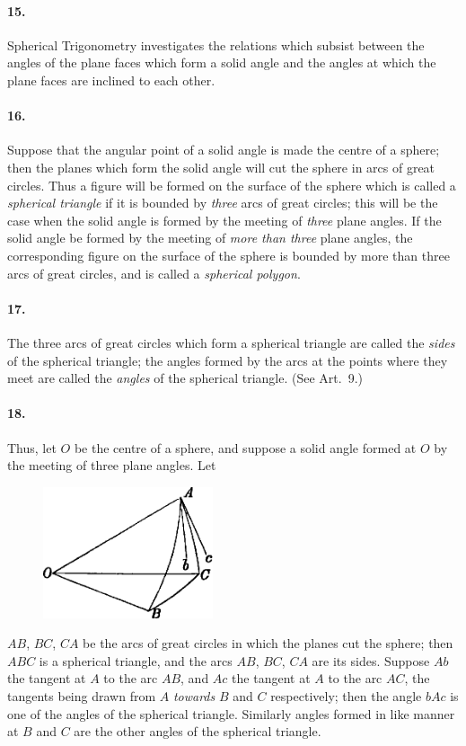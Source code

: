 \documentclass{book}[2004/02/16]
\begin{document}
\begin{mainmatter}
\begin{spacing}{1.3}
\paragraph{15.} Spherical Trigonometry investigates the relations which
subsist between the angles of the plane faces which form a solid
angle and the angles at which the plane faces are inclined to each
other.

\paragraph{16.} Suppose that the angular point of a solid angle is made
the centre of a sphere; then the planes which form the solid angle
will cut the sphere in arcs of great circles. Thus a figure will be
formed on the surface of the sphere which is called a \textit{spherical
triangle} if it is bounded by \textit{three} arcs of great circles; this will be
the case when the solid angle is formed by the meeting of \textit{three}
plane angles. If the solid angle be formed by the meeting of
\textit{more than three} plane angles, the corresponding figure on the
surface of the sphere is bounded by more than three arcs of great
circles, and is called a \textit{spherical polygon}.

\paragraph{17.} The three arcs of great circles which form a spherical
triangle are called the \textit{sides} of the spherical triangle; the angles
formed by the arcs at the points where they meet are called the
\textit{angles} of the spherical triangle. (See Art.~9.)

\paragraph{18.} Thus, let $O$ be the centre of a sphere, and suppose a solid
angle formed at $O$ by the meeting of three plane angles. Let
\begin{figure}[htp]
\centering
\includegraphics[width=5.0cm]{images/017fc}
\end{figure}
$AB$, $BC$, $CA$ be the arcs of great circles in which the planes cut
the sphere; then $ABC$ is a spherical triangle, and the arcs $AB$,
$BC$, $CA$ are its sides. Suppose $Ab$ the tangent at $A$ to the arc
$AB$, and $Ac$ the tangent at $A$ to the arc $AC$, the tangents being
drawn from $A$ \textit{towards} $B$ and $C$ respectively; then the angle $bAc$
is one of the angles of the spherical triangle. Similarly angles
formed in like manner at $B$ and $C$ are the other angles of the
spherical triangle.


\end{spacing}
\end{mainmatter}
\end{document}
